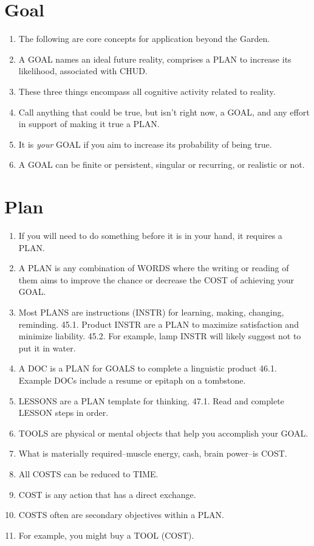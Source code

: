 \documentclass[
]{book}
\begin{document}
\hypertarget{goal}{%
\section{Goal}\label{goal}}

\begin{enumerate}
\def\labelenumi{\arabic{enumi}.}
\setcounter{enumi}{36}
\item
  The following are core concepts for application beyond the Garden.
\item
  A GOAL names an ideal future reality, comprises a PLAN to increase its
  likelihood, associated with CHUD.
\item
  These three things encompass all cognitive activity related to reality.
\item
  Call anything that could be true, but isn't right now, a GOAL, and any effort in support of making it true a PLAN.
\item
  It is \emph{your} GOAL if you aim to increase its probability of being true.
\item
  A GOAL can be finite or persistent, singular or recurring, or realistic or not.
\end{enumerate}

\hypertarget{plan-1}{%
\section{Plan}\label{plan-1}}

\begin{enumerate}
\def\labelenumi{\arabic{enumi}.}
\setcounter{enumi}{42}
\item
  If you will need to do something before it is in your hand, it requires a PLAN.
\item
  A PLAN is any combination of WORDS where the writing or reading of them aims
  to improve the chance or decrease the COST of achieving your GOAL.
\item
  Most PLANS are instructions (INSTR) for learning, making, changing, reminding.
  45.1. Product INSTR are a PLAN to maximize satisfaction and minimize liability.
  45.2. For example, lamp INSTR will likely suggest not to put it in water.
\item
  A DOC is a PLAN for GOALS to complete a linguistic product
  46.1. Example DOCs include a resume or epitaph on a tombstone.
\item
  LESSONS are a PLAN template for thinking.
  47.1. Read and complete LESSON steps in order.
\item
  TOOLS are physical or mental objects that help you accomplish your GOAL.
\item
  What is materially required--muscle energy, cash, brain power--is COST.
\item
  All COSTS can be reduced to TIME.
\item
  COST is any action that has a direct exchange.
\item
  COSTS often are secondary objectives within a PLAN.
\item
  For example, you might buy a TOOL (COST).
\end{enumerate}
\end{document}
